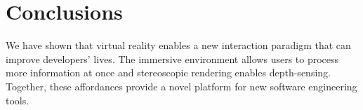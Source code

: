\documentclass{acm_proc_article-sp}
\begin{document}
\section{Conclusions}
We have shown that virtual reality enables a new interaction paradigm that can improve developers' lives. The immersive environment allows users to process more information at once and stereoscopic rendering enables depth-sensing. Together, these affordances provide a novel platform for new software engineering tools.




\end{document}

